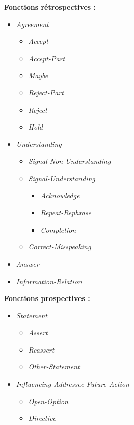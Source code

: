 \documentclass[10pt,a4paper,twoside]{article}
\begin{document}
\begin{figure}[h]
	\centering
	\noindent\parbox[t]{2.2in}{\raggedright%
	\textbf{Fonctions rétrospectives :}
	\begin{itemize}[topsep=0pt,itemsep=-2pt,leftmargin=15pt]
		\item \textit{Agreement }
		\begin{itemize}
			\item \textit{Accept}
			\item \textit{Accept-Part}
			\item \textit{Maybe}
			\item \textit{Reject-Part}
			\item \textit{Reject}
			\item \textit{Hold}
		\end{itemize}
		\item \textit{Understanding}
		\begin{itemize}
			\item \textit{Signal-Non-Understanding}
			\item \textit{Signal-Understanding}
			\begin{itemize}
				\item \textit{Acknowledge}
				\item \textit{Repeat-Rephrase}
				\item \textit{Completion}
			\end{itemize}
			\item \textit{Correct-Misspeaking}
		\end{itemize}
		\item \textit{Answer}
		\item \textit{Information-Relation}
	\end{itemize}
	}%
	\parbox[t]{2.2in}{\raggedright%
	\textbf{Fonctions prospectives :}
	\begin{itemize}[topsep=0pt,itemsep=-2pt,leftmargin=15pt]
		\item \textit{Statement}
		\begin{itemize}
			\item \textit{Assert}
			\item \textit{Reassert}
			\item \textit{Other-Statement}
		\end{itemize}
		\item \textit{Influencing Addressee Future Action}
		\begin{itemize}
			\item \textit{Open-Option}
			\item \textit{Directive}

\end{itemize}
\end{itemize}}
\end{figure}
\end{document}
